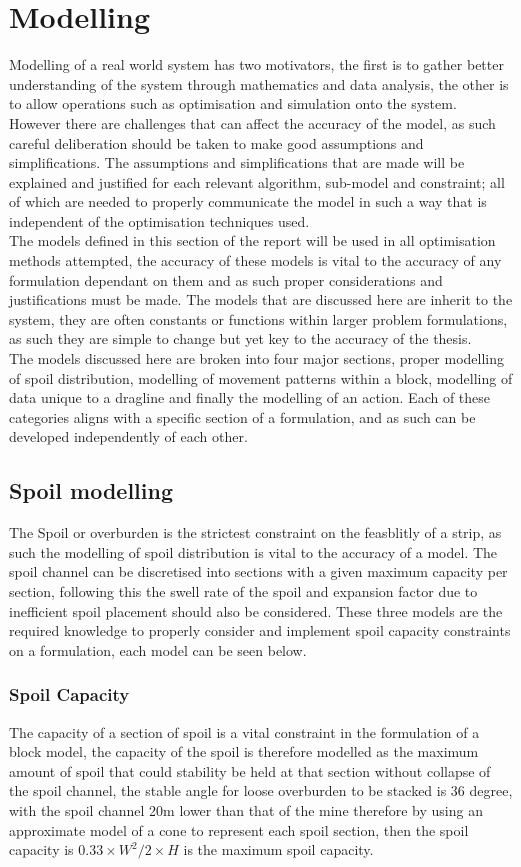 
\section{Modelling}
Modelling of a real world system has two motivators, the first is to gather better understanding of the system through mathematics and data analysis, the other is to allow operations such as optimisation and simulation onto the system. However there are challenges that can affect the accuracy of the model, as such careful deliberation should be taken to make good assumptions and simplifications. The assumptions and simplifications that are made will be explained and justified for each relevant algorithm, sub-model and constraint; all of which are needed to properly communicate the model in such a way that is independent of the optimisation techniques used.  
\\
The models defined in this section of the report will be used in all optimisation methods attempted, the accuracy of these models is vital to the accuracy of any formulation dependant on them and as such proper considerations and justifications must be made. The models that are discussed here are inherit to the system, they are often constants or functions within larger problem formulations, as such they are simple to change but yet key to the accuracy of the thesis. \\
The models discussed here are broken into four major sections, proper modelling of spoil distribution, modelling of movement patterns within a block, modelling of data unique to a dragline and finally the modelling of an action. Each of these categories aligns with a specific section of a formulation, and as such can be developed independently of each other. 
\subsection{Spoil modelling}
The Spoil or overburden is the strictest constraint on the feasblitly of a strip, as such the modelling of spoil distribution is vital to the accuracy of a model. The spoil channel can be discretised into sections with a given maximum capacity per section, following this the swell rate of the spoil and expansion factor due to inefficient spoil placement should also be considered. These three models are the required knowledge to properly consider and implement spoil capacity constraints on a formulation, each model can be seen below. 
\subsubsection{Spoil Capacity}
The capacity of a section of spoil is a vital constraint in the formulation of a block model, the capacity of the spoil is therefore modelled as the maximum amount of spoil that could stability be held at that section without collapse of the spoil channel, the stable angle for loose overburden to be stacked is 36 degree, with the spoil channel 20m lower than that of the mine therefore by using an approximate model of a cone to represent each spoil section, then the spoil capacity is $0.33\times W^2/2 \times H $ is the maximum spoil capacity. 
